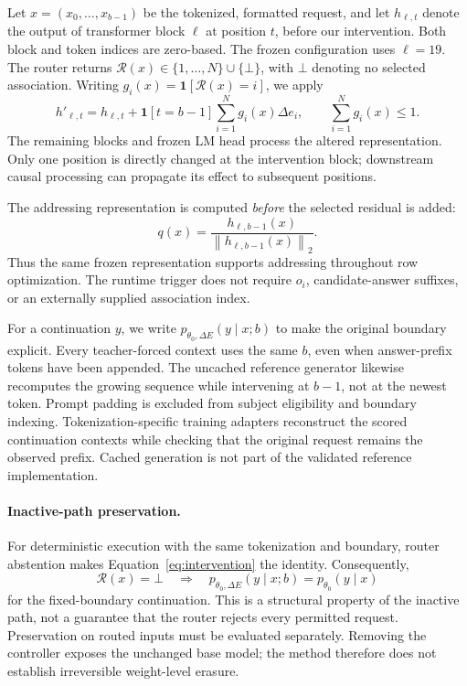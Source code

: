 \documentclass{article}
\newcommand{\ind}{\mathbf{1}}
\newcommand{\norm}[1]{\left\lVert#1\right\rVert_2}
\newcommand{\bank}{\Delta E}
\newcommand{\rowvec}{\Delta e}
\newcommand{\router}{\mathcal{R}}
\begin{document}
Let $x=(x_0,\ldots,x_{b-1})$ be the tokenized, formatted request, and let
$h_{\ell,t}$ denote the output of transformer block $\ell$ at position $t$,
before our intervention. Both block and token indices are zero-based. The
frozen configuration uses $\ell=19$. The router returns
$\router(x)\in\{1,\ldots,N\}\cup\{\bot\}$, with $\bot$ denoting no selected
association. Writing $g_i(x)=\ind[\router(x)=i]$, we apply
\begin{equation}
 h'_{\ell,t}
 =h_{\ell,t}+\ind[t=b-1]\sum_{i=1}^{N}g_i(x)\rowvec_i,
 \qquad \sum_{i=1}^{N}g_i(x)\leq 1.
 \label{eq:intervention}
\end{equation}
The remaining blocks and frozen LM head process the altered representation.
Only one position is directly changed at the intervention block; downstream
causal processing can propagate its effect to subsequent positions.

The addressing representation is computed \emph{before} the selected residual
is added:
\begin{equation}
 q(x)=\frac{h_{\ell,b-1}(x)}{\norm{h_{\ell,b-1}(x)}}.
 \label{eq:query}
\end{equation}
Thus the same frozen representation supports addressing throughout row
optimization. The runtime trigger does not require $o_i$, candidate-answer
suffixes, or an externally supplied association index.

For a continuation $y$, we write $p_{\theta_0,\bank}(y\mid x;b)$ to make the
original boundary explicit. Every teacher-forced context uses the same $b$,
even when answer-prefix tokens have been appended. The uncached reference
generator likewise recomputes the growing sequence while intervening at
$b-1$, not at the newest token. Prompt padding is excluded from subject
eligibility and boundary indexing. Tokenization-specific training adapters
reconstruct the scored continuation contexts while checking that the original
request remains the observed prefix. Cached generation is not part of the
validated reference implementation.

\paragraph{Inactive-path preservation.}
For deterministic execution with the same tokenization and boundary, router
abstention makes Equation~\eqref{eq:intervention} the identity. Consequently,
\begin{equation}
 \router(x)=\bot
 \quad\Longrightarrow\quad
 p_{\theta_0,\bank}(y\mid x;b)=p_{\theta_0}(y\mid x)
 \label{eq:inactive}
\end{equation}
for the fixed-boundary continuation. This is a structural property of the
inactive path, not a guarantee that the router rejects every permitted
request. Preservation on routed inputs must be evaluated separately. Removing
the controller exposes the unchanged base model; the method therefore does
not establish irreversible weight-level erasure.
\end{document}
